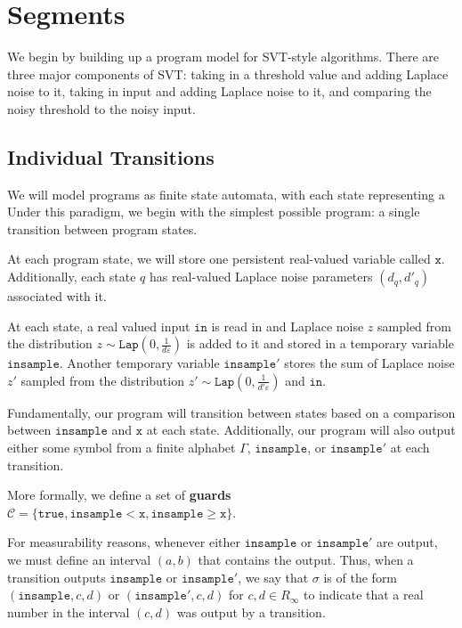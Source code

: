 \documentclass[12pt]{article}
\newcommand{\gguard}[1][x]{\texttt{insample}\geq #1}
\newcommand{\lguard}[1][x]{\texttt{insample} < #1}
\newcommand{\Lap}{\texttt{Lap}}
\theoremstyle{definition}
\begin{document}
\section{Segments}

We begin by building up a program model for SVT-style algorithms. There are three major components of SVT: taking in a threshold value and adding Laplace noise to it, taking in input and adding Laplace noise to it, and comparing the noisy threshold to the noisy input. 

\subsection{Individual Transitions}
We will model programs as finite state automata, with each state representing a Under this paradigm, we begin with the simplest possible program: a single transition between program states. 

At each program state, we will store one persistent real-valued variable called $\texttt{x}$. Additionally, each state $q$ has real-valued Laplace noise parameters $(d_q, d'_q)$ associated with it. 

At each state, a real valued input $\texttt{in}$ is read in and Laplace noise $z$ sampled from the distribution $z\sim \Lap(0, \frac{1}{d\varepsilon})$ is added to it and stored in a temporary variable $\texttt{insample}$. Another temporary variable $\texttt{insample}'$ stores the sum of Laplace noise $z'$ sampled from the distribution $z'\sim \Lap(0, \frac{1}{d'\varepsilon})$ and $\texttt{in}$. 

Fundamentally, our program will transition between states based on a comparison between $\texttt{insample}$ and $\texttt{x}$ at each state. Additionally, our program will also output either some symbol from a finite alphabet $\Gamma$, $\texttt{insample}$, or $\texttt{insample}'$ at each transition. 

More formally, we define a set of \textbf{guards} $\mathcal{C}=\{\texttt{true}, \lguard[\texttt{x}], \gguard[\texttt{x}]\}$. 

For measurability reasons, whenever either $\texttt{insample}$ or $\texttt{insample}'$ are output, we must define an interval $(a, b)$ that contains the output. Thus, when a transition outputs $\texttt{insample}$ or $\texttt{insample}'$, we say that $\sigma$ is of the form $(\texttt{insample}, c, d)$ or $(\texttt{insample}', c, d)$ for $c, d\in R_\infty$ to indicate that a real number in the interval $(c, d)$ was output by a transition. 
\end{document}
